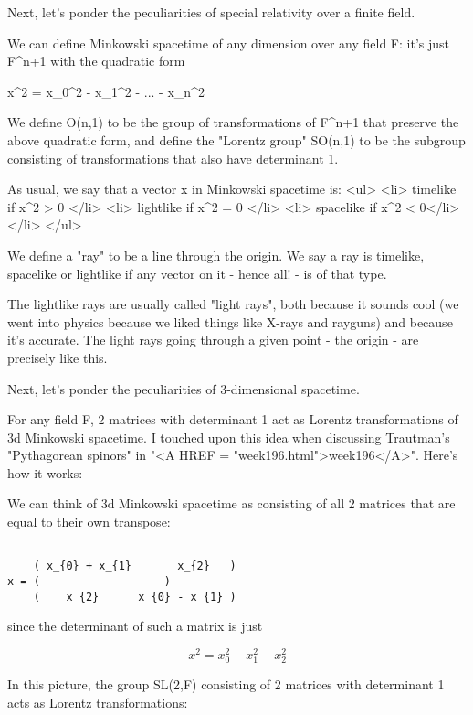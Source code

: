 Next, let's ponder the peculiarities of special relativity over a finite field.

We can define Minkowski spacetime of any dimension over any field F: 
it's just F^{n+1} with the quadratic form

x^{2} = x_{0}^{2} - x_{1}^{2} - ... - x_{n}^{2}

We define O(n,1) to be the group of transformations of F^{n+1} that preserve 
the above quadratic form, and define the "Lorentz group" 
SO(n,1) to be
the subgroup consisting of transformations that also have determinant 1.

As usual, we say that a vector x in Minkowski spacetime is:
<ul>
<li>
   timelike if  x^{2} > 0
</li>
<li>
   lightlike if x^{2} = 0
</li>
<li>
   spacelike if x^{2} < 0</li>
</li>
</ul>


We define a "ray" 
to be a line through the origin.  We say a ray is
timelike, spacelike or lightlike if any vector on it - hence all! - 
is of that type.

The lightlike rays are usually called "light rays", 
both because it sounds cool 
(we went into physics because we liked things like X-rays and rayguns) and 
because it's accurate.  The light rays going through a given point - the origin -
are precisely like this.   

Next, let's ponder the peculiarities of 3-dimensional spacetime.

For any field F, 2 matrices with determinant 1 act as Lorentz transformations
of 3d Minkowski spacetime.   I touched upon this idea when discussing Trautman's 
"Pythagorean spinors" 
in 
"<A HREF = "week196.html">week196</A>".   Here's how it works:

We can think of 3d Minkowski spacetime as consisting of all 2 matrices
that are equal to their own transpose:


\begin{verbatim}

    ( x_{0} + x_{1}       x_{2}   )
x = (                   )
    (    x_{2}      x_{0} - x_{1} )
\end{verbatim}
    
since the determinant of such a matrix is just 

$$

x^{2} = x_{0}^{2} - x_{1}^{2} - x_{2}^{2}
$$
    
In this picture, the group SL(2,F) consisting of 2 matrices with determinant 1
acts as Lorentz transformations:

